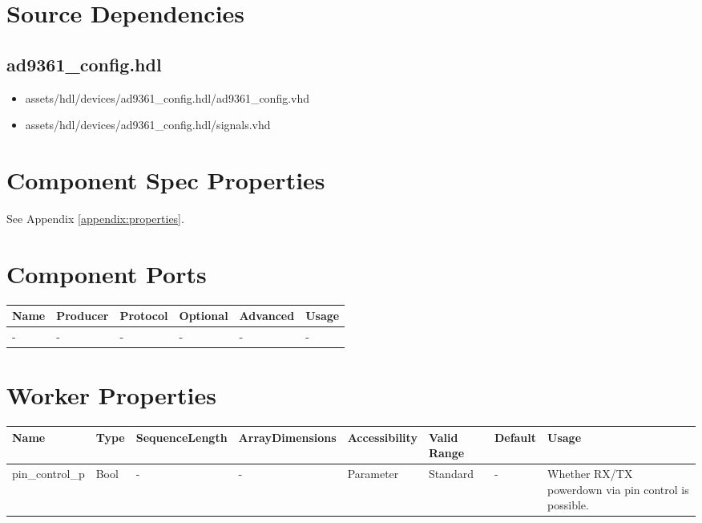 \documentclass{article}
\def\comp{ad9361\_config}
\begin{document}
\section{Source Dependencies}
\subsection{\comp.hdl}
\begin{itemize}
  \item assets/hdl/devices/\comp.hdl/\comp.vhd
  \item assets/hdl/devices/ad9361\_config.hdl/signals.vhd
\end{itemize}
\begin{landscape}
  \section{Component Spec Properties}
  See Appendix \ref{appendix:properties}.

  \section{Component Ports}
  \begin{scriptsize}
    \begin{tabular}{|p{2cm}|p{1.5cm}|p{4cm}|p{1.5cm}|p{1.5cm}|p{11.29cm}|}
      \hline
      \rowcolor{blue}
      Name & Producer & Protocol           & Optional & Advanced & Usage                  \\
      \hline
      -    & -        & -                  & -        & -        & - \\
      \hline
    \end{tabular}
  \end{scriptsize}

  \section{Worker Properties}
  \begin{scriptsize}
    \begin{tabular}{|p{3.75cm}|p{1.25cm}|p{2cm}|p{2.75cm}|p{1.5cm}|p{1.5cm}|p{1cm}|p{7.17cm}|}
      \hline
      \rowcolor{blue}
      Name               & Type & SequenceLength & ArrayDimensions & Accessibility      & Valid Range & Default & Usage                                                                               \\
      \hline
      pin\_control\_p & Bool & - & - & Parameter & Standard & - & Whether RX/TX powerdown via pin control is possible. \\
      \hline
    \end{tabular}
  \end{scriptsize}


\end{landscape}
\end{document}
